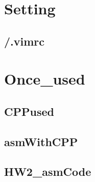 \section{Setting}

\subsection{/.vimrc}


\section{Once_used}

\subsection{CPPused}

\subsection{asmWithCPP}

\subsection{HW2_asmCode}

